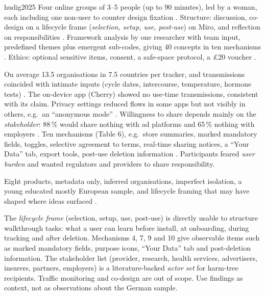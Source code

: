 \begin{papercard}{hudig2025}
 Four online groups of 3--5 people (up to 90 minutes), led by a woman, each including one non-user to counter design fixation . Structure: discussion, co-design on a lifecycle frame (\emph{selection, setup, use, post-use}) on Miro, and reflection on responsibilities . Framework analysis by one researcher with team input, predefined themes plus emergent sub-codes, giving 40 concepts in ten mechanisms . Ethics: optional sensitive items, consent, a safe-space protocol, a \pounds 20 voucher .

 On average 13.5 organisations in 7.5 countries per tracker, and transmissions coincided with intimate inputs (cycle dates, intercourse, temperature, hormone tests) . The on-device app (Cherry) showed no use-time transmissions, consistent with its claim. Privacy settings reduced flows in some apps but not visibly in others, e.g.\ an ``anonymous mode'' . Willingness to share depends mainly on the \emph{stakeholder}: 88\,\% would share nothing with ad platforms and 65\,\% nothing with employers . Ten mechanisms (Table 6), e.g.\ store summaries, marked mandatory fields, toggles, selective agreement to terms, real-time sharing notices, a ``Your Data'' tab, export tools, post-use deletion information . Participants feared \emph{user burden} and wanted regulators and providers to share responsibility.

 Eight products, metadata only, inferred organisations, imperfect isolation, a young educated mostly European sample, and lifecycle framing that may have shaped where ideas surfaced .

 The \emph{lifecycle frame} (selection, setup, use, post-use) is directly usable to structure walkthrough tasks: what a user can learn before install, at onboarding, during tracking and after deletion. Mechanisms 4, 7, 9 and 10 give observable items such as marked mandatory fields, purpose icons, ``Your Data'' tab and post-deletion information. The stakeholder list (provider, research, health services, advertisers, insurers, partners, employers) is a literature-backed \emph{actor set} for harm-tree recipients. Traffic monitoring and co-design are out of scope. Use findings as context, not as observations about the German sample.
\end{papercard}
